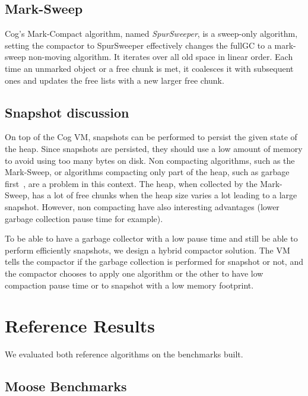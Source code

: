 \documentclass[10pt, sigplan]{acmart}
\begin{document}
\subsection{Mark-Sweep}

Cog's Mark-Compact algorithm, named \emph{SpurSweeper}, is a sweep-only algorithm, setting the compactor to SpurSweeper effectively changes the fullGC to a mark-sweep non-moving algorithm. It iterates over all old space in linear order. Each time an unmarked object or a free chunk is met, it coalesces it with subsequent ones and updates the free lists with a new larger free chunk. 

\subsection{Snapshot discussion}

On top of the Cog VM, snapshots can be performed to persist the given state of the heap. Since snapshots are persisted, they should use a low amount of memory to avoid using too many bytes on disk. Non compacting algorithms, such as the Mark-Sweep, or algorithms compacting only part of the heap, such as garbage first~\cite{G1}, are a problem in this context. The heap, when collected by the Mark-Sweep, has a lot of free chunks when the heap size varies a lot leading to a large snapshot. However, non compacting have also interesting advantages (lower garbage collection pause time for example). 

To be able to have a garbage collector with a low pause time and still be able to perform efficiently snapshots, we design a hybrid compactor solution. The VM tells the compactor if the garbage collection is performed for snapshot or not, and the compactor chooses to apply one algorithm or the other to have low compaction pause time or to snapshot with a low memory footprint.

\section{Reference Results}
\label{sec:valid}

We evaluated both reference algorithms on the benchmarks built.

\subsection{Moose Benchmarks}
\end{document}
